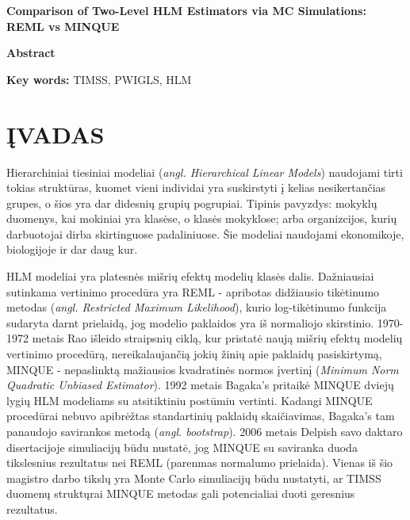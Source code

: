 \documentclass[12pt,a4paper]{article}
\begin{document}
\begin{center}{\large\textbf{Comparison of Two-Level HLM Estimators via MC Simulations: REML vs MINQUE}}\end{center}

\begin{small}
\vspace{2\baselineskip}
\begin{center}\textbf{Abstract}\end{center}


\vspace{\baselineskip}

\noindent\textbf{Key words:}
TIMSS, PWIGLS, HLM
\end{small}
\vspace{\baselineskip}

\newpage
\section{ĮVADAS}

\indent Hierarchiniai tiesiniai modeliai (\textit{angl. Hierarchical Linear Models}) naudojami tirti tokias struktūras, kuomet vieni individai yra suskirstyti į kelias nesikertančias grupes, o šios yra dar didesnių grupių pogrupiai. Tipinis pavyzdys: mokyklų duomenys, kai mokiniai yra klasėse, o klasės mokyklose; arba organizcijos, kurių darbuotojai dirba skirtinguose padaliniuose. Šie modeliai naudojami ekonomikoje, biologijoje ir dar daug kur.

\indent HLM modeliai yra platesnės mišrių efektų modelių klasės dalis. Dažniausiai sutinkama vertinimo procedūra yra REML - apribotas didžiausio tikėtinumo metodas (\textit{angl. Restricted Maximum Likelihood}), kurio log-tikėtinumo funkcija sudaryta darnt prielaidą, jog modelio paklaidos yra iš normaliojo skirstinio. 1970-1972 metais Rao išleido straipsnių ciklą, kur pristatė naują mišrių efektų modelių vertinimo procedūrą, nereikalaujančią jokių žinių apie paklaidų pasiskirtymą, MINQUE - nepaslinktą mažiausios kvadratinės normos įvertinį (\textit{Minimum Norm Quadratic Unbiased Estimator}). 
1992 metais Bagaka's pritaikė MINQUE dviejų lygių HLM modeliams su atsitiktiniu postūmiu vertinti. Kadangi MINQUE procedūrai nebuvo apibrėžtas standartinių paklaidų skaičiavimas, Bagaka's tam panaudojo savirankos metodą (\textit{angl. bootstrap}). 2006 metais Delpish savo daktaro disertacijoje simuliacijų būdu nustatė, jog MINQUE su saviranka duoda tikslesnius rezultatus nei REML (parenmas normalumo prielaida). Vienas iš šio magistro darbo tikslų yra Monte Carlo simuliacijų būdu nustatyti, ar TIMSS duomenų struktųrai MINQUE metodas gali potencialiai duoti geresnius rezultatus.
\end{document}
